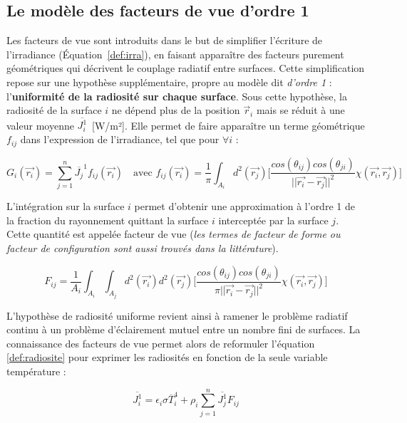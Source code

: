 \subsection{Le modèle des facteurs de vue d'ordre 1}

Les facteurs de vue sont introduits dans le but de simplifier l'écriture de l'irradiance (Équation~\ref{def:irra}), en faisant apparaître des facteurs purement géométriques qui décrivent le couplage radiatif entre surfaces. Cette simplification repose sur une hypothèse supplémentaire, propre au modèle dit \emph{d'ordre 1} : l'\textbf{uniformité de la radiosité sur chaque surface}. Sous cette hypothèse, la radiosité de la surface $i$ ne dépend plus de la position $\vec{r}_i$ mais se réduit à une valeur moyenne $\overline{J_i^1}$~[W/m²]. Elle permet de faire apparaître un terme géométrique $f_{ij}$ dans l'expression de l'irradiance, tel que pour $\forall i$ :

\begin{equation}
    G_i(\vec{r_i}) = \sum_{j = 1}^{n} \overline{J_j}^1 f_{ij}(\vec{r_i}) \quad \text{avec } f_{ij}(\vec{r_i}) =\frac{1}{\pi} \int_{A_i} d^2(\vec{r_j})\bigg[\frac{cos(\theta_{ij})cos(\theta_{ji})}{||\vec{r_i}-\vec{r_j}||^2} \chi{(\vec{r_i},\vec{r_j})}\bigg] 
\end{equation}

L'intégration sur la surface $i$ permet d'obtenir une approximation à l'ordre 1 de la fraction du rayonnement quittant la surface $i$ interceptée par la surface $j$. Cette quantité est appelée facteur de vue (\textit{les termes de facteur de forme ou facteur de configuration sont aussi trouvés dans la littérature}).

\begin{equation}
    \label{def:fv}
    F_{ij} = \frac{1}{A_i} \int_{A_i} \int_{A_j} d^2(\vec{r_i}) d^2(\vec{r_j})\bigg[\frac{cos(\theta_{ij})cos(\theta_{ji})}{\pi ||\vec{r_i}-\vec{r_j}||^2} \chi(\vec{r_i},\vec{r_j})\bigg] 
\end{equation}


L'hypothèse de radiosité uniforme revient ainsi à ramener le problème radiatif continu à un problème d'éclairement mutuel entre un nombre fini de surfaces. La connaissance des facteurs de vue permet alors de reformuler l'équation \ref{def:radiosite} pour exprimer les radiosités en fonction de la seule variable température :

\begin{equation}
    \overline{J_i^1} = \epsilon_i \sigma \overline{T}^4_i  + \rho_i \sum_{j=1}^{n} \overline{J_j^1} F_{ij}
    \label{def:radio}
\end{equation}


